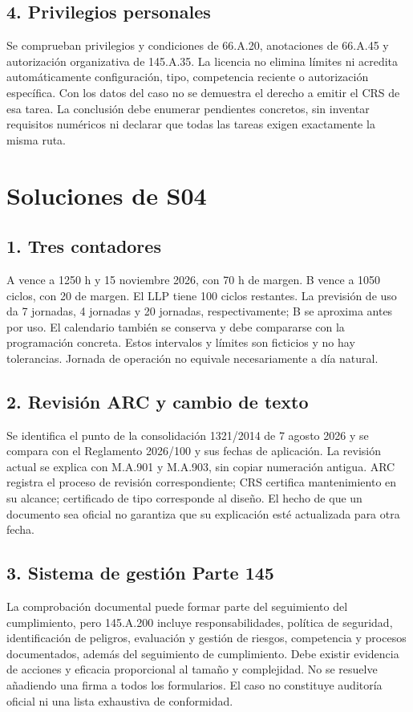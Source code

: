 
\section{4. Privilegios personales}
Se comprueban privilegios y condiciones de 66.A.20, anotaciones de 66.A.45 y autorización organizativa de 145.A.35. La licencia no elimina límites ni acredita automáticamente configuración, tipo, competencia reciente o autorización específica. Con los datos del caso no se demuestra el derecho a emitir el CRS de esa tarea. La conclusión debe enumerar pendientes concretos, sin inventar requisitos numéricos ni declarar que todas las tareas exigen exactamente la misma ruta.

\chapter{Soluciones de S04}
\section{1. Tres contadores}
A vence a 1250 h y 15 noviembre 2026, con 70 h de margen. B vence a 1050 ciclos, con 20 de margen. El LLP tiene 100 ciclos restantes. La previsión de uso da 7 jornadas, 4 jornadas y 20 jornadas, respectivamente; B se aproxima antes por uso. El calendario también se conserva y debe compararse con la programación concreta. Estos intervalos y límites son ficticios y no hay tolerancias. Jornada de operación no equivale necesariamente a día natural.



\section{2. Revisión ARC y cambio de texto}
Se identifica el punto de la consolidación 1321/2014 de 7 agosto 2026 y se compara con el Reglamento 2026/100 y sus fechas de aplicación. La revisión actual se explica con M.A.901 y M.A.903, sin copiar numeración antigua. ARC registra el proceso de revisión correspondiente; CRS certifica mantenimiento en su alcance; certificado de tipo corresponde al diseño. El hecho de que un documento sea oficial no garantiza que su explicación esté actualizada para otra fecha.

\section{3. Sistema de gestión Parte 145}
La comprobación documental puede formar parte del seguimiento del cumplimiento, pero 145.A.200 incluye responsabilidades, política de seguridad, identificación de peligros, evaluación y gestión de riesgos, competencia y procesos documentados, además del seguimiento de cumplimiento. Debe existir evidencia de acciones y eficacia proporcional al tamaño y complejidad. No se resuelve añadiendo una firma a todos los formularios. El caso no constituye auditoría oficial ni una lista exhaustiva de conformidad.


